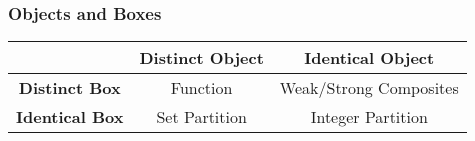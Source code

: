 \subsubsection{Objects and Boxes}

\begin{table}
\begin{center}
\begin{tabular}{ccc} \hline
    & \textbf{Distinct Object} & \textbf{Identical Object} \\ \hline
    \textbf{Distinct Box} & Function & Weak/Strong Composites \\ \hline
    \textbf{Identical Box} & Set Partition & Integer Partition \\ \hline
\end{tabular}
\label{tb: boxesObjects}
\end{center}
\end{table}

